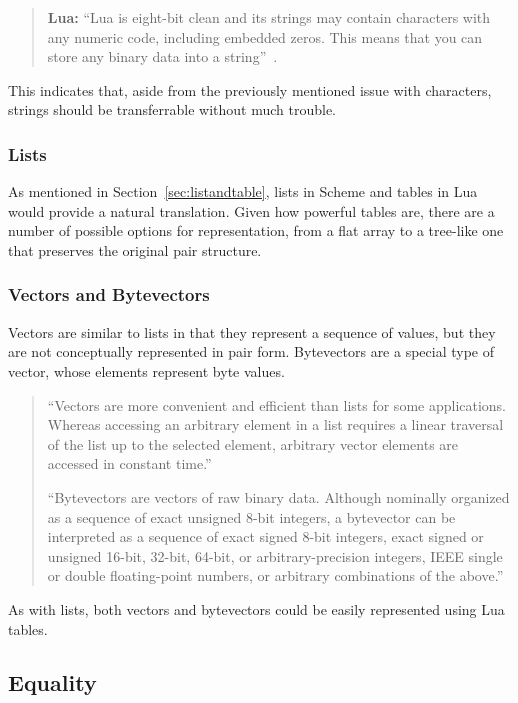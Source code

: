 \begin{quotation}\textbf{Lua:}
``Lua is eight-bit clean and its strings may contain characters with any numeric
code, including embedded zeros. This means that you can store any binary data
into a string''~\cite[p.11]{luabook}.
\end{quotation}

This indicates that, aside from the previously mentioned issue with characters, strings should be transferrable without much trouble.

\subsubsection{Lists}

As mentioned in Section~\ref{sec:listandtable}, lists in Scheme and tables in
Lua would provide a natural translation. Given how powerful tables are, there
are a number of possible options for representation, from a flat array to a
tree-like one that preserves the original pair structure.

\subsubsection{Vectors and Bytevectors}

Vectors are similar to lists in that they represent a sequence of values, but
they are not conceptually represented in pair form. Bytevectors are a special
type of vector, whose elements represent byte values.
\begin{quotation}
``Vectors are more convenient and efficient than lists for some applications.
Whereas accessing an arbitrary element in a list requires a linear traversal of
the list up to the selected element, arbitrary vector elements are accessed in
constant time.''~\cite[Sec~6.9]{tspl}

``Bytevectors are vectors of raw binary data. Although nominally organized as a
sequence of exact unsigned 8-bit integers, a bytevector can be interpreted as a
sequence of exact signed 8-bit integers, exact signed or unsigned 16-bit,
32-bit, 64-bit, or arbitrary-precision integers, IEEE single or double
floating-point numbers, or arbitrary combinations of the
above.''~\cite[Sec~6.10]{tspl}
\end{quotation} 
As with lists, both vectors and bytevectors could be easily represented using Lua tables.

\subsection{Equality}

